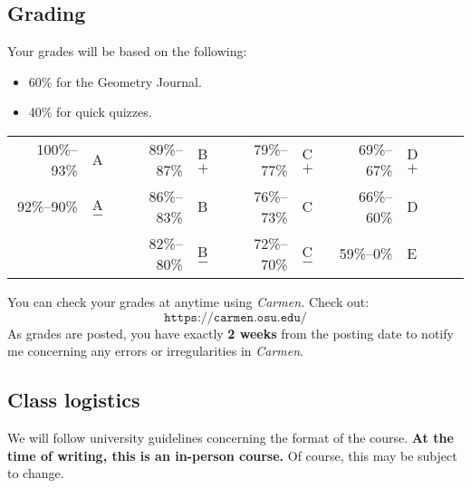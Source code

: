 \documentclass[12pt]{amsart}
\begin{document}
\subsection*{Grading} Your grades will be based on the following:
\begin{itemize}
  \item 60\% for the Geometry Journal.
  \item 40\% for quick quizzes.
\end{itemize}
\begin{center}
  \begin{tabular}{|r l | r l | r l | r l | r l |}\hline
    100\%--93\% & A    & 89\%--87\% & B$+$ & 79\%--77\% & C$+$ & 69\%--67\% &
    D$+$
    \\
    92\%--90\%  & A$-$ & 86\%--83\% & B    & 76\%--73\% & C    & 66\%--60\% & D
    \\
                &      & 82\%--80\% & B$-$ & 72\%--70\% & C$-$ & 59\%--0\%  & E
    \\
    \hline
  \end{tabular}
\end{center}

You can check your grades at anytime using \textit{Carmen.} Check out:
\[
  \texttt{https://carmen.osu.edu/}
\]
As grades are posted, you have exactly \textbf{2 weeks} from the
posting date to notify me concerning any errors or irregularities in
\textit{Carmen}.

\subsection*{Class logistics}
We will follow university guidelines concerning the format of the
course.  \textbf{At the time of writing, this is an in-person course.}
Of course, this may be subject to change.

\end{document}
